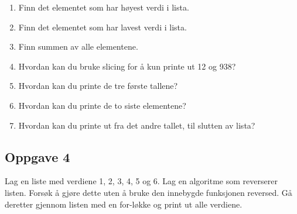 \documentclass{article}
\begin{document}
\begin{enumerate}
    \item Finn det elementet som har høyest verdi i lista.
     \item Finn det elementet som har lavest verdi i lista.
      \item Finn summen av alle elementene.
      \item Hvordan kan du bruke slicing for å kun printe ut 12 og 938?
      \item Hvordan kan du printe de tre første tallene?
      \item Hvordan kan du printe de to siste elementene?
      \item Hvordan kan du printe ut fra det andre tallet, til slutten av lista?
\end{enumerate}


\subsection*{Oppgave 4}
Lag en liste med verdiene 1, 2, 3, 4, 5 og 6. Lag en algoritme som reverserer listen. Forsøk å gjøre dette uten å bruke den innebygde funksjonen reversed. Gå deretter gjennom listen med en for-løkke og print ut alle verdiene.
\end{document}
